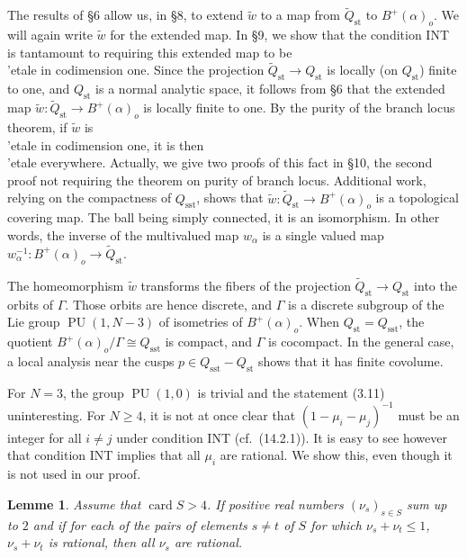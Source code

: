 \documentclass[12pt,a4paper]{article}
\theoremstyle{plain}
\newtheorem{lemma}[theorem]{Lemme}
\theoremstyle{definition}
\theoremstyle{remark}
\DeclareMathOperator{\card}{card}
\DeclareMathOperator{\PU}{PU}
\numberwithin{equation}{section}
\begin{document}
The results of \S 6 allow us, in \S 8, to extend $\widetilde{w}$ to a map from $\widetilde{Q}_{\mathrm{st}}$ to $B^+(\alpha)_o$. We will again write $\widetilde{w}$ for the extended map. In \S 9, we show that the condition INT is tantamount to requiring this extended map to be \\'etale in codimension one. Since the projection $\widetilde{Q}_{\mathrm{st}} \to Q_{\mathrm{st}}$ is locally (on $Q_{\mathrm{st}}$) finite to one, and $Q_{\mathrm{st}}$ is a normal analytic space, it follows from \S 6 that the extended map $\widetilde{w}: \widetilde{Q}_{\mathrm{st}} \to B^+(\alpha)_o$ is locally finite to one. By the purity of the branch locus theorem, if $\widetilde{w}$ is \\'etale in codimension one, it is then \\'etale everywhere. Actually, we give two proofs of this fact in \S 10, the second proof not requiring the theorem on purity of branch locus. Additional work, relying on the compactness of $Q_{\mathrm{sst}}$, shows that $\widetilde{w}: \widetilde{Q}_{\mathrm{st}} \to B^+(\alpha)_o$ is a topological covering map. The ball being simply connected, it is an isomorphism. In other words, the inverse of the multivalued map $w_\alpha$ is a single valued map $w_\alpha^{-1}: B^+(\alpha)_o \to \widetilde{Q}_{\mathrm{st}}$.

The homeomorphism $\widetilde{w}$ transforms the fibers of the projection $\widetilde{Q}_{\mathrm{st}} \to Q_{\mathrm{st}}$ into the orbits of $\Gamma$. Those orbits are hence discrete, and $\Gamma$ is a discrete subgroup of the Lie group $\PU(1, N-3)$ of isometries of $B^+(\alpha)_o$. When $Q_{\mathrm{st}} = Q_{\mathrm{sst}}$, the quotient $B^+(\alpha)_o/\Gamma \cong Q_{\mathrm{sst}}$ is compact, and $\Gamma$ is cocompact. In the general case, a local analysis near the cusps $p \in Q_{\mathrm{sst}} - Q_{\mathrm{st}}$ shows that it has finite covolume.

For $N = 3$, the group $\PU(1, 0)$ is trivial and the statement (3.11) uninteresting. For $N \geq 4$, it is not at once clear that $(1-\mu_i-\mu_j)^{-1}$ must be an integer for all $i \neq j$ under condition INT (cf.\ (14.2.1)). It is easy to see however that condition INT implies that all $\mu_i$ are rational. We show this, even though it is not used in our proof.

\begin{lemma}\label{lem:3.12}
Assume that $\card S > 4$. If positive real numbers $(\nu_s)_{s \in S}$ sum up to $2$ and if for each of the pairs of elements $s \neq t$ of $S$ for which $\nu_s + \nu_t \leq 1$, $\nu_s + \nu_t$ is rational, then all $\nu_s$ are rational.
\end{lemma}
\end{document}
